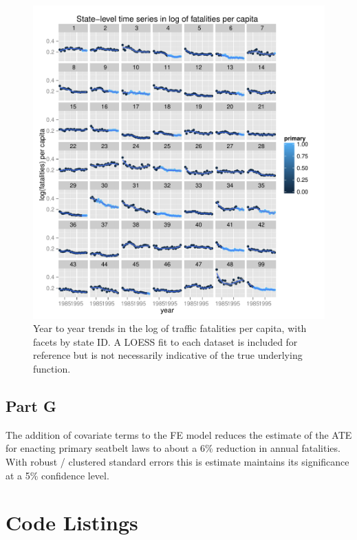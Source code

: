 \documentclass[letterpaper, 12pt]{article}
\begin{document}
\begin{figure}[htbp]
\begin{center}
\includegraphics{allstates.pdf}
\caption{Year to year trends in the log of traffic fatalities per capita, with facets by state ID.  A LOESS fit to each dataset is included for reference but is not necessarily indicative of the true underlying function.}
\label{fig:3f}
\end{center}
\end{figure}


\subsection{Part G}

The addition of covariate terms to the FE model reduces the estimate of the ATE for enacting primary seatbelt laws to about a 6\% reduction in annual fatalities.  With robust / clustered standard errors this is estimate maintains its significance at a 5\% confidence level. 



\section{Code Listings}
\end{document}
